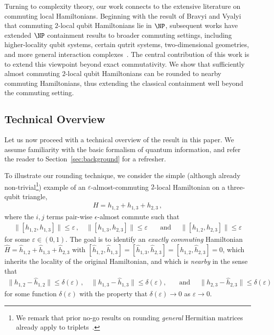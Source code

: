 \documentclass[a4paper,onecolumn,11pt]{quantumarticle}
\theoremstyle{plain}
\newcommand{\eps}{\varepsilon}
\begin{document}
Turning to complexity theory, our work connects to the extensive literature
on commuting local Hamiltonians.  Beginning with the result of Bravyi and
Vyalyi~\cite{bravyi2004commutativeversionklocalhamiltonian} that commuting
$2$-local qubit Hamiltonians lie in $\NP$, subsequent works have extended
$\NP$ containment results to broader commuting settings, including
higher-locality qubit systems, certain qutrit systems, two-dimensional
geometries, and more general interaction complexes~\cite{aharonov2011complexity,schuch2011complexitycommutinghamiltonianssquare,AKV,irani2023commutinglocalhamiltonianproblem,bostanci2025commutinglocalhamiltonians2d}.
The central contribution of this work is to extend this viewpoint beyond
exact commutativity.  We show that sufficiently almost commuting $2$-local
qubit Hamiltonians can be rounded to nearby commuting Hamiltonians, thus
extending the classical containment well beyond the commuting setting.


\subsection{Technical Overview}
Let us now proceed with a technical overview of the result in this paper. We assume familiarity with the basic formalism of quantum information, and refer the reader to Section~\ref{sec:background} for a refresher.

To illustrate our rounding technique, we consider the simple (although already non-trivial\footnote{We remark that prior no-go results on rounding \emph{general} Hermitian matrices already apply to triplets~\cite{Davidson1985}.}) example of an $\eps$-almost-commuting $2$-local Hamiltonian on a three-qubit triangle,
\begin{align}
H = h_{1,2} + h_{1,3} + h_{2,3} \, , 
\end{align}
where the $i,j$ terms pair-wise $\epsilon$-almost commute such that 
\begin{align}
\| [h_{1,2},h_{1,3}]\| \leq \eps \, , \quad \| [h_{1,3},h_{2,3}]\| \leq \eps \quad\,\,\, \text{ and } \quad \| [h_{1,2},h_{2,3}]\| \leq \eps
\end{align}
for some $\eps \in (0,1)$. The goal is to identify an \emph{exactly commuting} Hamiltonian $\hat{H} = \hat h_{1,2} + \hat h_{1,3} + \hat h_{2,3}$ with $[\hat h_{1,2},\hat h_{1,3}] = [\hat h_{1,3},\hat h_{2,3}] = [\hat h_{1,2},\hat h_{2,3}] = 0$, which inherits the locality of the original Hamiltonian, and which is \emph{nearby} in the sense that
\begin{align}
\| h_{1,2} - \hat h_{1,2}\| \leq \delta(\eps) \, , \quad\| h_{1,3} - \hat h_{1,3}\| \leq \delta(\eps), \quad\,\,\, \text{ and } \quad \| h_{2,3} - \hat h_{2,3}\| \leq \delta(\eps)
\end{align}
for some function $\delta(\eps)$ with the property that $\delta(\eps) \rightarrow 0$ as $\eps \rightarrow 0$.
\end{document}
